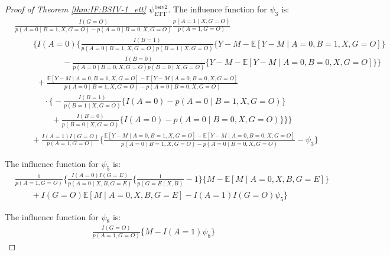 \documentclass[10pt]{article}
\begin{document}
\begin{proof}[Proof of Theorem \ref{thm:IF:BSIV-1_ett} $\psi_{\text{ETT}}^{\text{bsiv2}}$]
The influence function for $\psi_3$ is:
{\footnotesize \begin{align*}
    &\frac{I(G=O)}{p(A=0\mid B=1,X,G=O)-p(A=0\mid B=0,X,G=O)}\frac{p(A=1\mid X, G=O)}{p(A=1,G=O)}\\
    &\ \ \ \ \ \ \ \ \ \ \bigg\{I(A=0)\big\{\frac{I(B=1)}{p(A=0\mid B=1,X,G=O)p(B=1\mid X,G=O)}\{Y-M-\mathbb{E}[Y-M\mid A=0,B=1,X,G=O]\}\\
    &\ \ \ \ \ \ \ \ \ \ \ \ \ \ \ \ \ \ \ \ \ \ \ \ \ \ -\frac{I(B=0)}{p(A=0\mid B=0,X,G=O)p(B=0\mid X,G=O)}\{Y-M-\mathbb{E}[Y-M\mid A=0,B=0,X,G=O]\}\big\}\\
    &\ \ \ \ \ \ \ \ \ \ \ \ +\frac{\mathbb{E}[Y-M\mid A=0,B=1,X,G=O]-\mathbb{E}[Y-M\mid A=0,B=0,X,G=O]}{p(A=0\mid B=1,X,G=O)-p(A=0\mid B=0,X,G=O)}\\
    &\ \ \ \ \ \ \ \ \ \ \ \ \ \ \ \ \cdot\big\{-\frac{I(B=1)}{p(B=1\mid X, G=O)}\{I(A=0)-p(A=0\mid B=1,X,G=O)\}\\
    &\ \ \ \ \ \ \ \ \ \ \ \ \ \ \ \ \ \ \ \ +\frac{I(B=0)}{p(B=0\mid X, G=O)}\{I(A=0)-p(A=0\mid B=0,X,G=O)\}\big\}\bigg\}\\
    &\ \ \ \ \ \ \ \ \  +\frac{I(A=1)I(G=O)}{p(A=1,G=O)}\bigg\{\frac{\mathbb{E}[Y-M\mid A=0,B=1,X,G=O]-\mathbb{E}[Y-M\mid A=0,B=0,X,G=O]}{p(A=0\mid B=1,X,G=O)-p(A=0\mid B=0,X,G=O)}-\psi_3\bigg\}
\end{align*}}

The influence function for $\psi_5$ is:
\begin{align*}
    &\frac{1}{p(A=1,G=O)}\bigg\{\frac{I(A=0)I(G=E)}{p(A=0\mid X,B,G=E)}\{\frac{1}{p(G=E\mid X,B)}-1\}\{M-\mathbb{E}[M\mid A=0,X,B,G=E]\}\\
    &\ \ \ \ \ \ \ \ \ +I(G=O)\mathbb{E}[M\mid A=0,X,B,G=E]-I(A=1)I(G=O)\psi_5\bigg\}
\end{align*}

The influence function for $\psi_8$ is:
\begin{align*}
    \frac{I(G=O)}{p(A=1,G=O)}\{M-I(A=1)\psi_8\}
\end{align*}



\end{proof}
\end{document}
